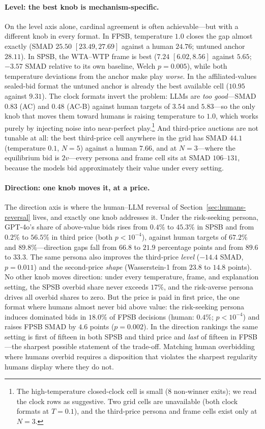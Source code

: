 \paragraph{Level: the best knob is mechanism-specific.} On the level axis alone, cardinal agreement is often achievable---but with a different knob in every format. In FPSB, temperature $1.0$ closes the gap almost exactly (SMAD $25.50$ $[23.49,27.69]$ against a human $24.76$; untuned anchor $28.11$). In SPSB, the WTA--WTP frame is best ($7.24$ $[6.02,8.56]$ against $5.65$; $-3.57$ SMAD relative to its own baseline, Welch $p=0.005$), while both temperature deviations from the anchor make play \emph{worse}. In the affiliated-values sealed-bid format the untuned anchor is already the best available cell ($10.95$ against $9.31$). The clock formats invert the problem: LLMs are \emph{too good}---SMAD $0.83$ (AC) and $0.48$ (AC-B) against human targets of $3.54$ and $5.83$---so the only knob that moves them toward humans is raising temperature to $1.0$, which works purely by injecting noise into near-perfect play.\footnote{The high-temperature closed-clock cell is small ($8$ non-winner exits); we read the clock rows as suggestive. Two grid cells are unavailable (both clock formats at $T{=}0.1$), and the third-price persona and frame cells exist only at $N{=}3$.} And third-price auctions are not tunable at all: the best third-price cell anywhere in the grid has SMAD $44.1$ (temperature $0.1$, $N{=}5$) against a human $7.66$, and at $N{=}3$---where the equilibrium bid is $2v$---every persona and frame cell sits at SMAD $106$--$131$, because the models bid approximately their value under every setting.

\paragraph{Direction: one knob moves it, at a price.} The direction axis is where the human--LLM reversal of Section~\ref{sec:humans-reversal} lives, and exactly one knob addresses it. Under the risk-seeking persona, GPT-4o's share of above-value bids rises from $0.4\%$ to $45.3\%$ in SPSB and from $0.2\%$ to $56.5\%$ in third price (both $p<10^{-4}$), against human targets of $67.2\%$ and $89.8\%$---direction gaps fall from $66.8$ to $21.9$ percentage points and from $89.6$ to $33.3$. The same persona also improves the third-price \emph{level} ($-14.4$ SMAD, $p=0.011$) and the second-price \emph{shape} (Wasserstein-1 from $23.8$ to $14.8$ points). No other knob moves direction: under every temperature, frame, and explanation setting, the SPSB overbid share never exceeds $17\%$, and the risk-averse persona drives all overbid shares to zero. But the price is paid in first price, the one format where humans almost never bid above value: the risk-seeking persona induces dominated bids in $18.0\%$ of FPSB decisions (human: $0.4\%$; $p<10^{-4}$) and raises FPSB SMAD by $4.6$ points ($p=0.002$). In the direction rankings the same setting is first of fifteen in both SPSB and third price and \emph{last} of fifteen in FPSB---the sharpest possible statement of the trade-off. Matching human overbidding where humans overbid requires a disposition that violates the sharpest regularity humans display where they do not.

